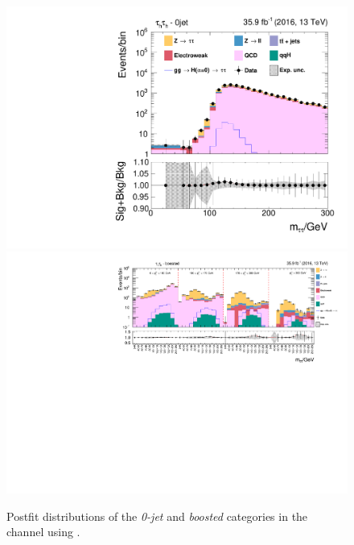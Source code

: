 \begin{figure}[h!]
    \centering
        \includegraphics[width=.5\textwidth]{Figures/statana/Postfit_JEC_jdphi/postfit_fit_s_htt_tt_1_13TeV.pdf}\\
        \includegraphics[width=\textwidth]{Figures/statana/Postfit_JEC_jdphi/postfit_fit_s_htt_tt_2_13TeV.pdf}    
    \caption{Postfit distributions of the \textit{0-jet} and \textit{boosted} categories in the \tautau{} channel  using \jdphi{}.}
\end{figure}
